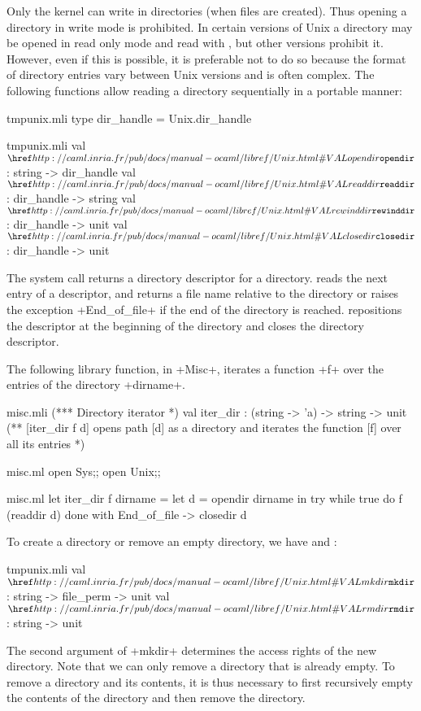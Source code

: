 Only the kernel can write in directories (when files are
created). Thus opening a directory in write mode is prohibited. In
certain versions of Unix a directory may be opened in read only mode
and read with , but other versions prohibit
it. However, even if this is possible, it is preferable not to do so
because the format of directory entries vary between Unix versions and
is often complex. The following functions allow reading a directory
sequentially in a portable manner:
%
\begin{codefile}{tmpunix.mli}
type dir_handle = Unix.dir_handle
\end{codefile}
%
\begin{listingcodefile}{tmpunix.mli}
val $\libvalue{Unix}{opendir}$   : string -> dir_handle
val $\libvalue{Unix}{readdir}$   : dir_handle -> string
val $\libvalue{Unix}{rewinddir}$ : dir_handle -> unit
val $\libvalue{Unix}{closedir}$  : dir_handle -> unit
\end{listingcodefile}
% 
The system call  returns a directory descriptor for a
directory.  reads the next entry of a descriptor, and
returns a file name relative to the directory or raises the exception
\ml+End_of_file+ if the end of the directory is
reached.  repositions the descriptor at the
beginning of the directory and  closes the directory
descriptor.

\begin{example}
The following library function, in \ml+Misc+, iterates a
function \ml+f+ over the entries of the directory \ml+dirname+.
%
\begin{codefile}{misc.mli}
(*** Directory iterator *)
val iter_dir : (string -> 'a) -> string -> unit
(** [iter_dir f d] opens path [d] as a directory and iterates the 
function [f] over all its entries *)
\end{codefile}
%
\begin{codefile}{misc.ml}
open Sys;;
open Unix;;
\end{codefile}
%
\begin{listingcodefile}{misc.ml}
let iter_dir f dirname =
  let d = opendir dirname in
  try while true do f (readdir d) done
  with End_of_file -> closedir d
\end{listingcodefile}
\end{example}

To create a directory or remove an empty directory, we have
 and :
%
\begin{listingcodefile}{tmpunix.mli}
val $\libvalue{Unix}{mkdir}$ : string -> file_perm -> unit
val $\libvalue{Unix}{rmdir}$ : string -> unit
\end{listingcodefile}
% 
The second argument of \ml+mkdir+ determines the access rights of the
new directory.  Note that we can only remove a directory that is
already empty. To remove a directory and its contents, it is thus
necessary to first recursively empty the contents of the directory and
then remove the directory.

